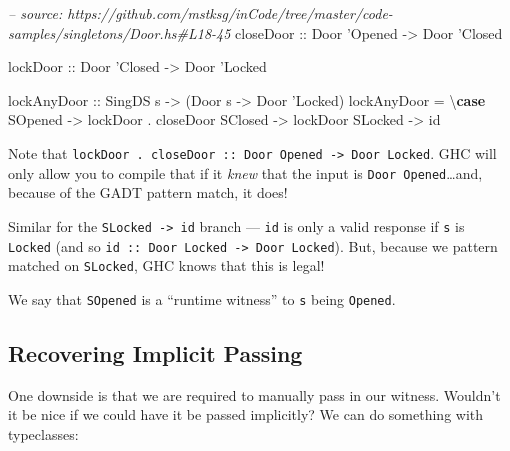 \documentclass[]{article}
\newenvironment{Shaded}{}{}
\newcommand{\KeywordTok}[1]{\textcolor[rgb]{0.00,0.44,0.13}{\textbf{#1}}}
\newcommand{\DataTypeTok}[1]{\textcolor[rgb]{0.56,0.13,0.00}{#1}}
\newcommand{\CharTok}[1]{\textcolor[rgb]{0.25,0.44,0.63}{#1}}
\newcommand{\CommentTok}[1]{\textcolor[rgb]{0.38,0.63,0.69}{\textit{#1}}}
\newcommand{\OtherTok}[1]{\textcolor[rgb]{0.00,0.44,0.13}{#1}}
\newcommand{\FunctionTok}[1]{\textcolor[rgb]{0.02,0.16,0.49}{#1}}
\newcommand{\NormalTok}[1]{#1}
\begin{document}
\begin{Shaded}
\begin{Highlighting}[]
\CommentTok{-- source: https://github.com/mstksg/inCode/tree/master/code-samples/singletons/Door.hs#L18-45}
\OtherTok{closeDoor ::} \DataTypeTok{Door} \CharTok{'Opened -> Door '}\DataTypeTok{Closed}

\OtherTok{lockDoor ::} \DataTypeTok{Door} \CharTok{'Closed -> Door '}\DataTypeTok{Locked}

\OtherTok{lockAnyDoor ::} \DataTypeTok{SingDS}\NormalTok{ s }\OtherTok{->}\NormalTok{ (}\DataTypeTok{Door}\NormalTok{ s }\OtherTok{->} \DataTypeTok{Door} \CharTok{'Locked)}
\NormalTok{lockAnyDoor }\FunctionTok{=}\NormalTok{ \textbackslash{}}\KeywordTok{case}
    \DataTypeTok{SOpened} \OtherTok{->}\NormalTok{ lockDoor }\FunctionTok{.}\NormalTok{ closeDoor}
    \DataTypeTok{SClosed} \OtherTok{->}\NormalTok{ lockDoor}
    \DataTypeTok{SLocked} \OtherTok{->}\NormalTok{ id}
\end{Highlighting}
\end{Shaded}

Note that
\texttt{lockDoor\ .\ closeDoor\ ::\ Door\ \textquotesingle{}Opened\ -\textgreater{}\ Door\ \textquotesingle{}Locked}.
GHC will only allow you to compile that if it \emph{knew} that the input is
\texttt{Door\ \textquotesingle{}Opened}\ldots{}and, because of the GADT pattern
match, it does!

Similar for the \texttt{SLocked\ -\textgreater{}\ id} branch --- \texttt{id} is
only a valid response if \texttt{s} is \texttt{\textquotesingle{}Locked} (and so
\texttt{id\ ::\ Door\ \textquotesingle{}Locked\ -\textgreater{}\ Door\ \textquotesingle{}Locked}).
But, because we pattern matched on \texttt{SLocked}, GHC knows that this is
legal!

We say that \texttt{SOpened} is a ``runtime witness'' to \texttt{s} being
\texttt{\textquotesingle{}Opened}.

\subsection{Recovering Implicit Passing}\label{recovering-implicit-passing}

One downside is that we are required to manually pass in our witness. Wouldn't
it be nice if we could have it be passed implicitly? We can do something with
typeclasses:
\end{document}
